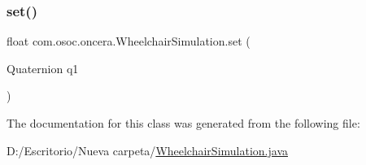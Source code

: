 \mbox{\label{classcom_1_1osoc_1_1oncera_1_1_wheelchair_simulation_abe82a50fd607d3f929d5071813b9839e}} 
\subsubsection{\texorpdfstring{set()}{set()}}
{\footnotesize\ttfamily float com.\+osoc.\+oncera.\+Wheelchair\+Simulation.\+set (\begin{DoxyParamCaption}\item[{Quaternion}]{q1 }\end{DoxyParamCaption})}



The documentation for this class was generated from the following file\+:\begin{DoxyCompactItemize}
\item 
D\+:/\+Escritorio/\+Nueva carpeta/\mbox{\hyperlink{_wheelchair_simulation_8java}{Wheelchair\+Simulation.\+java}}\end{DoxyCompactItemize}
